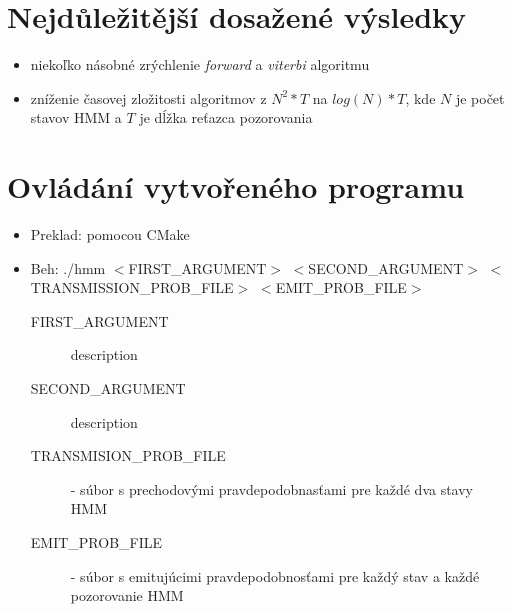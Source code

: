 \documentclass[11pt,a4paper]{article}
\begin{document}


\section{Nejdůležitější dosažené výsledky}
\begin{itemize}
\item niekoľko násobné zrýchlenie \textit{forward} a \textit{viterbi} algoritmu
\item zníženie časovej zložitosti algoritmov z $N^{2}*T$ na $log(N)*T$, kde $N$ je počet stavov HMM a $T$ je dĺžka reťazca pozorovania
\end{itemize}

\section{Ovládání vytvořeného programu}
\begin{itemize}
\item Preklad: pomocou CMake
\item Beh: ./hmm $<$FIRST\_ARGUMENT$>$ $<$SECOND\_ARGUMENT$>$ $<$TRANSMISSION\_PROB\_FILE$>$ $<$EMIT\_PROB\_FILE$>$
\begin{description}
\item [FIRST\_ARGUMENT] description
\item [SECOND\_ARGUMENT] description
\item [TRANSMISION\_PROB\_FILE] - súbor s prechodovými pravdepodobnasťami pre každé dva stavy HMM
\item [EMIT\_PROB\_FILE] - súbor s emitujúcimi pravdepodobnosťami pre každý stav a každé pozorovanie HMM
\end{description}
\end{itemize}
\end{document}
